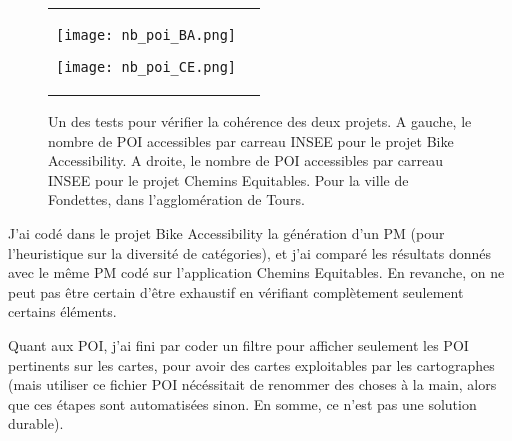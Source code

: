 \begin{figure}[H]
\centering
    \begin{tabular}{cc}    
        \begin{minipage}[t]{2.5in}
        \centering
        \texttt{[image: nb\_poi\_BA.png]}
        \end{minipage}
        \begin{minipage}[t]{2.5in}
        \centering
        \texttt{[image: nb\_poi\_CE.png]}
        \end{minipage}
    \end{tabular}
    \caption{Un des tests pour vérifier la cohérence des deux projets. A gauche, le nombre de POI accessibles par carreau INSEE pour le projet Bike Accessibility. A droite, le nombre de POI accessibles par carreau INSEE pour le projet Chemins Equitables. Pour la ville de Fondettes, dans l'agglomération de Tours.}
    \label{fig:nb_poi_compa}
\end{figure}

J'ai codé dans le projet Bike Accessibility la génération d'un PM (pour l'heuristique sur la diversité de catégories), et j'ai comparé les résultats donnés avec le même PM codé sur l'application Chemins Equitables. En revanche, on ne peut pas être certain d'être exhaustif en vérifiant complètement seulement certains éléments.

Quant aux POI, j'ai fini par coder un filtre pour afficher seulement les POI pertinents sur les cartes, pour avoir des cartes exploitables par les cartographes (mais utiliser ce fichier POI nécéssitait de renommer des choses à la main, alors que ces étapes sont automatisées sinon. En somme, ce n'est pas une solution durable).
